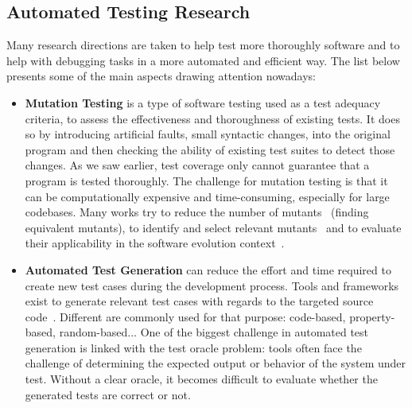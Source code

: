 \subsection{Automated Testing Research}

Many research directions are taken to help test more thoroughly software and to help with debugging tasks in a more automated and efficient way. The list below presents some of the main aspects drawing attention nowadays:

\begin{itemize}[label={}]
    \item \textbf{Mutation Testing} is a type of software testing used as a test adequacy criteria, \ie to assess the effectiveness and thoroughness of existing tests. It does so by introducing artificial faults, small syntactic changes, into the original program and then checking the ability of existing test suites to detect those changes. As we saw earlier, test coverage only cannot guarantee that a program is tested thoroughly. The challenge for mutation testing is that it can be computationally expensive and time-consuming, especially for large codebases. Many works try to reduce the number of mutants~\cite{Offut1993,siami2008sufficient} (\eg finding equivalent mutants), to identify and select relevant mutants~\cite{garg2022cerebro,ojdanic2022use,titcheu2020selecting} and to evaluate their applicability in the software evolution context~\cite{ojdanic2023MutantSelection,ma2020commit}.
    
    \item \textbf{Automated Test Generation} can reduce the effort and time required to create new test cases during the development process. Tools and frameworks exist to generate relevant test cases with regards to the targeted source code~\cite{fraser2011evosuite,fraser2012whole,pacheco2007randoop}. Different are commonly used for that purpose: code-based, property-based, random-based... One of the biggest challenge in automated test generation is linked with the test oracle problem: tools often face the challenge of determining the expected output or behavior of the system under test. Without a clear oracle, it becomes difficult to evaluate whether the generated tests are correct or not.
        

\end{itemize}
